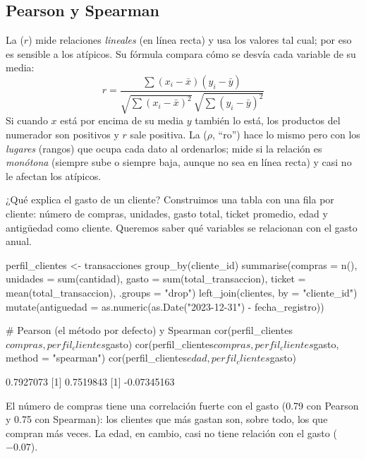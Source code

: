 \subsection{Pearson y Spearman}

La  ($r$) mide relaciones \emph{lineales}
(en línea recta) y usa los valores tal cual; por eso es sensible a los
atípicos. Su fórmula compara cómo se desvía cada variable de su media:
\[
  r = \frac{\sum (x_i - \bar{x})(y_i - \bar{y})}
           {\sqrt{\sum (x_i - \bar{x})^2}\,\sqrt{\sum (y_i - \bar{y})^2}}
\]
Si cuando $x$ está por encima de su media $y$ también lo está, los productos
del numerador son positivos y $r$ sale positiva. La  ($\rho$, ``ro'') hace lo mismo pero con los \emph{lugares}
(rangos) que ocupa cada dato al ordenarlos; mide si la relación es
\emph{monótona} (siempre sube o siempre baja, aunque no sea en línea recta) y
casi no le afectan los atípicos.

\begin{ejemplo}{¿Qué explica el gasto de un cliente?}
Construimos una tabla con una fila por cliente: número de compras, unidades,
gasto total, ticket promedio, edad y antigüedad como cliente. Queremos saber
qué variables se relacionan con el gasto anual.
\end{ejemplo}

\begin{rcode}
perfil_clientes <- transacciones %
  group_by(cliente_id) %
  summarise(compras   = n(),
            unidades  = sum(cantidad),
            gasto     = sum(total_transaccion),
            ticket    = mean(total_transaccion),
            .groups = "drop") %
  left_join(clientes, by = "cliente_id") %
  mutate(antiguedad = as.numeric(as.Date("2023-12-31") - fecha_registro))

# Pearson (el método por defecto) y Spearman
cor(perfil_clientes$compras, perfil_clientes$gasto)
cor(perfil_clientes$compras, perfil_clientes$gasto, method = "spearman")
cor(perfil_clientes$edad, perfil_clientes$gasto)
\end{rcode}
\begin{rsalida}
[1] 0.7927073
[1] 0.7519843
[1] -0.07345163
\end{rsalida}

El número de compras tiene una correlación fuerte con el gasto (0.79 con
Pearson y 0.75 con Spearman): los clientes que más gastan son,
sobre todo, los que compran más veces. La edad, en cambio, casi no tiene
relación con el gasto ($-0.07$).

